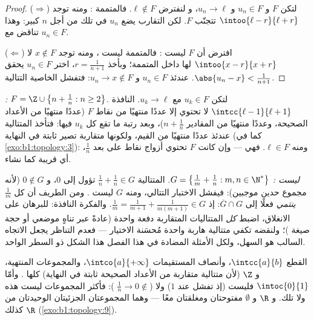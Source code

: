 \begin{proof}
($\Rightarrow$) لتكن $F$  و $u_n \in F$ و $u_n \to \ell$، و
لنفترض $\ell \notin F$. فالمتممة : ومنه توجد
$\intoo{\ell - r}{\ell + r}$ تتجنّب $F$. لكن التقارب يضع $u_n$
في تلك  من أجل $n$ كبير: وهذا تناقض مع $u_n \in F$.

($\Leftarrow$) افترض أن $F$ ليست : فالمتممة ليست ،
ومنه توجد $x \notin F$ لا  $\intoo{x - r}{x + r}$ لها داخل
المتممة؛ وبأخذ $r = \frac{1}{n+1}$، اختر $u_n \in F$ يحقق
$\abs{u_n - x} < \frac{1}{n+1}$. عندئذ $u_n \in F$ و $u_n \to x \notin
F$: فتفشل الخاصية التتالية.
\end{proof}

\begin{example}\label{ex:b1:topology:seqtest}
\emph{:} $F = \Z \cup \bigl\{n + \frac1n : n \geq 2\bigr\}$.
لتكن $u_k \in F$ مع $u_k \to \ell$. النافذة $\intcc{\ell -
1}{\ell + 1}$ لا تحتوي إلا عددًا منتهيًا من نقاط $F$ (عددًا منتهيًا
من الأعداد الصحيحة، وعددًا منتهيًا من المقادير $n + \frac1n$)، وبعد رتبة ما
تقع كل $u_k$ فيها: فتأخذ المتتالية عندئذ عددًا منتهيًا من
القيم، ولكونها متقاربة تصير ثابتة في النهاية (كما في
\cref{exo:b1:topology:3}): ومنه $\ell \in F$. فهي  --- وإن كانت
$F$ تحتوي أزواج نقاط على بعد $\frac1n$، أي قريبة
كما نشاء.

\emph{ليست :} $G = \bigl\{\frac1m + \frac1n : m, n \in
\N^*\bigr\}$. المتتالية $\frac1n + \frac1n \in G$ تؤول إلى
$0$، و $0 \notin G$ (لأنه مجموع حدين موجبين): فيفشل
الاختبار التتالي، ومنه  $G$ ليست . ومن الطريف أن كل
$\frac1m$ \emph{ينتمي} فعلًا إلى $\overline G \cap G$: إذ
$\frac1m = \frac{1}{m+1} + \frac{1}{m(m+1)} \in G$. والفكرة
النافذة: للبرهان على الانغلاق، اضبط \emph{كل} المتتاليات
المتقاربة دفعة واحدة (عادةً عبر تناهٍ موضعي أو حجة
صيغة )؛ ولنقضه تكفي متتالية هاربة واحدة
مُحسَنة الاختيار --- فعدم التناظر يجعل الاتجاه السالب
هو السهل، ولكل الأمثلة المضادة في هذا الفصل هذا الشكل ذو
السطر الواحد.
\end{example}

\begin{example}\label{ex:b1:topology:closed}
القطع $\intcc{a}{b}$، وأنصاف المستقيمات $\intco{a}{+\infty}$، والمجموعات
المنتهية، و $\Z$ (لأن متتالية متقاربة من الأعداد الصحيحة ثابتة في النهاية)
كلها . وأمّا $\intoc{0}{1}$ فليست  (إذ تفشل عند $1$) ولا 
($\frac 1n \to 0 \notin$ ): فأكثر المجموعات ليست هذه ولا تلك. و $\R$ و
$\emptyset$ مفتوحتان ومغلقتان معًا --- وهما المجموعتان الجزئيتان الوحيدتان
من $\R$ كذلك (\cref{exo:b1:topology:9}).
\end{example}

